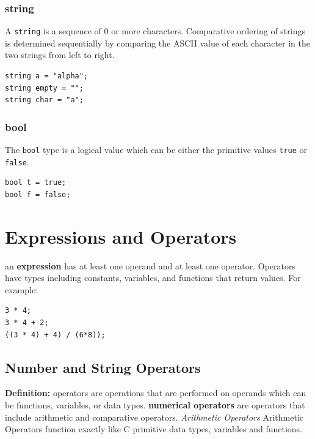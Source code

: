 \documentclass{article}
\newcommand{\code}[1]{\texttt{#1}} %
\begin{document}
\subsubsection{string}

A \code{string} is a sequence of 0 or more characters. Comparative ordering of strings is determined sequentially by comparing the ASCII value of each character in the two strings from left to right.

\begin{lstlisting}[language=pltLang, caption=Declaration of ``string'' types., label=lst:string]
string a = "alpha";
string empty = "";
string char = "a";
\end{lstlisting}

\subsubsection{bool}

The \code{bool} type is a logical value which can be either the primitive values \code{true} or \code{false}.

\begin{lstlisting}[language=pltLang, caption=Declaration of ``bool'' types., label=lst:bool]
bool t = true;
bool f = false;
\end{lstlisting}

\section{Expressions and Operators}

an \textbf{expression} has at least one operand and at least one operator. Operators have types including constants, variables, and functions that return values. For example:

\begin{lstlisting}[language=pltLang, caption=demonstration of expressions and subexpressions, label=lst:expr]
3 * 4; 
3 * 4 + 2;
((3 * 4) + 4) / (6*8));

\end{lstlisting} 

\subsection{Number and String Operators}

\textbf{Definition:} operators are operations that are performed on operands which can be functions, variables, or data types. 
\textbf{numerical operators} are operators that include arithmetic and comparative operators.
\emph{Arithmetic Operators}
Arithmetic Operators function exactly like C primitive data types, variables and functions.\\ 
\end{document}
